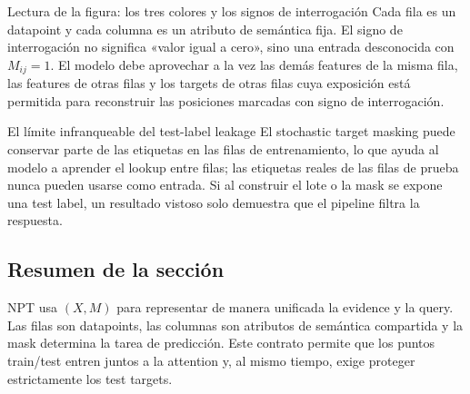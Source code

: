 \begin{knowledgebox}{Lectura de la figura: los tres colores y los signos de interrogación}
Cada fila es un datapoint y cada columna es un atributo de semántica fija. El signo de interrogación no significa «valor igual a cero», sino una entrada desconocida con $M_{ij}=1$. El modelo debe aprovechar a la vez las demás features de la misma fila, las features de otras filas y los targets de otras filas cuya exposición está permitida para reconstruir las posiciones marcadas con signo de interrogación.
\end{knowledgebox}

\begin{warningbox}{El límite infranqueable del test-label leakage}
El stochastic target masking puede conservar parte de las etiquetas en las filas de entrenamiento, lo que ayuda al modelo a aprender el lookup entre filas; las etiquetas reales de las filas de prueba nunca pueden usarse como entrada. Si al construir el lote o la mask se expone una test label, un resultado vistoso solo demuestra que el pipeline filtra la respuesta.
\end{warningbox}


\subsection{Resumen de la sección}

NPT usa $(X,M)$ para representar de manera unificada la evidence y la query. Las filas son datapoints, las columnas son atributos de semántica compartida y la mask determina la tarea de predicción. Este contrato permite que los puntos train/test entren juntos a la attention y, al mismo tiempo, exige proteger estrictamente los test targets.
